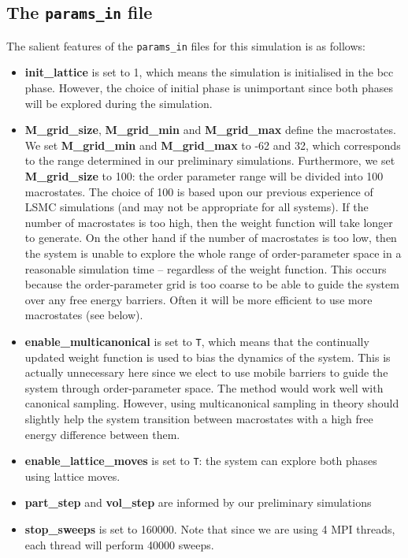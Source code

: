 \documentclass{report}
\begin{document}
\subsection{The \texttt{params\_in} file}
The salient features of the \texttt{params\_in} files for this simulation is as follows:
\begin{itemize}
\item \textbf{init\_lattice} is set to 1, which means the simulation is initialised in the bcc phase. However, the choice of initial phase is 
  unimportant since both phases will be explored during the simulation.
\item \textbf{M\_grid\_size}, \textbf{M\_grid\_min} and \textbf{M\_grid\_max} define the macrostates. We set \textbf{M\_grid\_min} and \textbf{M\_grid\_max}
  to -62 and 32, which corresponds to the
  range determined in our preliminary simulations. Furthermore, we set \textbf{M\_grid\_size} to 100: the order parameter range will be divided into
  100 macrostates. The choice of 100 is based upon our previous experience of LSMC simulations (and may not be appropriate for all systems). 
  If the number of macrostates is too high, then the weight function will take longer to generate. On the other hand if the number of macrostates
  is too low, then the system is unable to explore the whole range of order-parameter space in a reasonable simulation time -- regardless
  of the weight function. This occurs because the order-parameter grid is too coarse to be able to guide the system over any free energy barriers.
  Often it will be more efficient to use more macrostates (see below).
\item \textbf{enable\_multicanonical} is set to \texttt{T}, which means that the continually updated weight function is used to bias the dynamics of the system.
  This is actually unnecessary here since we elect to use mobile barriers to guide the system through order-parameter space. The method would
  work well with canonical sampling. However, using multicanonical sampling in theory should slightly help the system transition between 
  macrostates with a high free energy difference between them.
\item \textbf{enable\_lattice\_moves} is set to \texttt{T}: the system can explore both phases using lattice moves.
\item \textbf{part\_step} and \textbf{vol\_step} are informed by our preliminary simulations
\item \textbf{stop\_sweeps} is set to 160000. Note that since we are using 4 MPI threads, each thread will perform 40000 sweeps.

\end{itemize}
\end{document}
